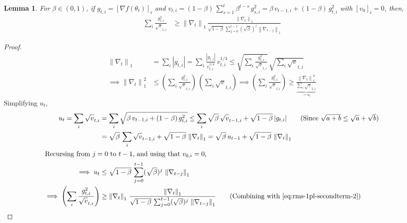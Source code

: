 \documentclass{article}
\newtheorem{lemma}{Lemma}
\newcommand{\ti}[1]{#1_{t,i}}
\newcommand{\tpi}[1]{#1_{t-1,i}}
\newcommand{\si}[1]{#1_{s,i}}
\newcommand{\normsq}[1]{\left\|#1 \right\|^{2}}
\newcommand{\norm}[1]{\left\|#1 \right\|}
\newcommand{\tht}{\theta_t}
\begin{document}
\begin{lemma}
For $\beta \in (0,1)$, if $\ti{g} = [\nabla f(\tht)]_{i}$ and $\ti{v} = (1-\beta) \, \sum_{s = 1}^t \beta^{t -s} \, \si{g^2}  = \beta \, \tpi{v} + (1-\beta) \, \ti{g^2}$ with $[v_0]_i = 0$, then, 
\begin{align*}
\sum_i \frac{\ti{g^2}}{\ti{\sqrt{v}}} & \geq \norm{\nabla_t}_1 \, \frac{\norm{\nabla_t}_1}{\sqrt{1 - \beta} \, \sum_{j = 0}^{t-1} (\sqrt{\beta})^{j} \, \norm{\nabla_{t-j}}_1}    
\end{align*}
\label{lemma:rms-precond-bound}    
\end{lemma}
\begin{proof}
\begin{align}
\norm{\nabla_t}_1 &= \sum_i |\ti{g}| = \sum_i \frac{|\ti{g}|}{\ti{v^{1/4}}} \, \ti{v^{1/4}} \leq \sqrt{\sum_i \frac{\ti{g^2}}{\ti{\sqrt{v}}} } \, \sqrt{\sum_i \ti{\sqrt{v}}} \tag{By Cauchy Schwarz} \nonumber \\
\implies \normsq{\nabla_t}_1 & \leq \left(\sum_i \frac{\ti{g^2}}{\ti{\sqrt{v}}}\right) \, \left(\sum_i \ti{\sqrt{v}}\right) \implies \left(\sum_i \frac{\ti{g^2}}{\ti{\sqrt{v}}}\right) \geq \frac{\normsq{\nabla_t}_1}{\underbrace{\sum_i \ti{\sqrt{v}} }_{:= u_t} } \label{eq:rms-1pl-secondterm-2} 
\end{align}
Simplifying $u_t$,
\begin{align}
u_t = \sum_i \ti{\sqrt{v}}  &  = \sum_i \sqrt{\beta \, \tpi{v} + (1-\beta) \, \ti{g^2}} \leq \sum_i \sqrt{\beta} \, \tpi{\sqrt{v}} + \sqrt{1-\beta} \, |\ti{g}| \tag{Since $\sqrt{a + b} \leq \sqrt{a} + \sqrt{b}$} \nonumber \\
& = \sqrt{\beta} \, \sum_{i}  \tpi{\sqrt{v}} + \sqrt{1-\beta} \, \norm{\nabla_t}_1 = \sqrt{\beta} \, u_{t-1} + \sqrt{1 - \beta} \, \norm{\nabla_t}_1 \\
\intertext{Recursing from $j = 0$ to $t-1$, and using that $v_{0,i} = 0$,}
\implies u_t &\leq \sqrt{1 - \beta} \, \sum_{j = 0}^{t-1} (\sqrt{\beta})^{j} \, \norm{\nabla_{t-j}}_1 \label{eq:rms-1pl-urecursion} \\
\implies \left(\sum_i \frac{\ti{g^2}}{\ti{\sqrt{v}}}\right) & \geq \norm{\nabla_t}_1 \, \frac{\norm{\nabla_t}_1}{\sqrt{1 - \beta} \, \sum_{j = 0}^{t-1} (\sqrt{\beta})^{j} \, \norm{\nabla_{t-j}}_1}\tag{Combining with~\cref{eq:rms-1pl-secondterm-2}}
\end{align}
\end{proof}
    
\end{document}
